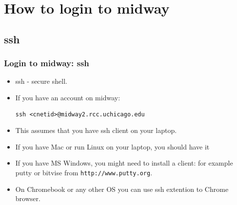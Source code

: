 \section{How to login to midway}

\subsection{ssh}
\begin{frame}[fragile]
  \frametitle{Login to midway: ssh}
  \begin{itemize}
  \item {\color{mycolorcli}ssh} - {\color{mycolordef}s}ecure {\color{mycolordef}sh}ell. 
  \item {\color{mycolordef}If you have an account on midway}:
{\color{mycolorcli}
\begin{verbatim}
ssh <cnetid>@midway2.rcc.uchicago.edu
\end{verbatim}
}
  \item This assumes that you have ssh client on your laptop.
  \item If you have Mac or run Linux on your laptop, you should have it
  \item If you have MS Windows, you might need to install a client: 
    for example {\color{mycolorcli}putty} or {\color{mycolorcli}bitvise} from  {\color{mycolorcli}\verb|http://www.putty.org|}.
  \item On Chromebook or any other OS you can use ssh extention to Chrome browser.
  \end{itemize}
\end{frame}

